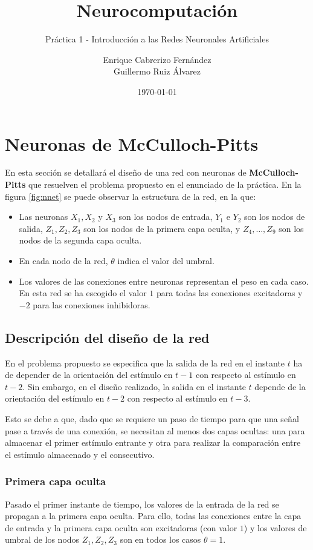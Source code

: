 \documentclass[spanish]{assignment}
\title{Neurocomputación}
\subtitle{Práctica 1 - Introducción a las Redes Neuronales Artificiales}
\author{Enrique Cabrerizo Fernández\\ Guillermo Ruiz Álvarez}
\date{\today}
\begin{document}
	\makepre
	\section{Neuronas de McCulloch-Pitts}
	En esta sección se detallará el diseño de una red con neuronas de \textbf{McCulloch-Pitts} que resuelven el problema propuesto en el enunciado de la práctica. En la figura \ref{fig:nnet} se puede observar la estructura de la red, en la que:
	\begin{itemize}
		\item Las neuronas $X_1, X_2$ y $X_3$ son los nodos de entrada, $Y_1$ e $Y_2$ son los nodos de salida, $Z_1, Z_2, Z_3$ son los nodos de la primera capa oculta, y $Z_4, \hdots, Z_9$ son los nodos de la segunda capa oculta. 
		\item En cada nodo de la red, $\theta$ indica el valor del umbral. 
		\item Los valores de las conexiones entre neuronas representan el peso en cada caso. En esta red se ha escogido el valor $1$ para todas las conexiones excitadoras y $-2$ para las conexiones inhibidoras.
	\end{itemize}
	
	\subsection{Descripción del diseño de la red}
	En el problema propuesto se especifica que la salida de la red en el instante $t$ ha de depender de la orientación del estímulo en $t-1$ con respecto al estímulo en $t-2$. Sin embargo, en el diseño realizado, la salida en el instante $t$ depende de la orientación del estímulo en $t-2$ con respecto al estímulo en $t-3$.
	
	Esto se debe a que, dado que se requiere un paso de tiempo para que una señal pase a través de una conexión, se necesitan al menos dos capas ocultas: una para almacenar el primer estímulo entrante y otra para realizar la comparación entre el estímulo almacenado y el consecutivo. 
	
	\subsubsection{Primera capa oculta}
	Pasado el primer instante de tiempo, los valores de la entrada de la red se propagan a la primera capa oculta. Para ello, todas las conexiones entre la capa de entrada y la primera capa oculta son excitadoras (con valor $1$) y los valores de umbral de los nodos $Z_1, Z_2, Z_3$ son en todos los casos $\theta = 1$.
	
\end{document}
